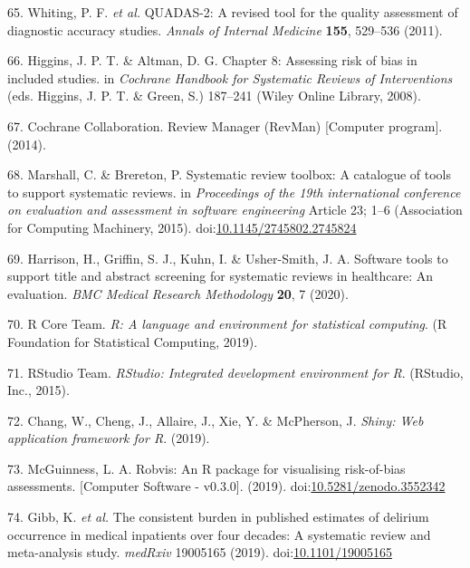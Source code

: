 \documentclass[a4paper, twoside]{templates/ociamthesis}
\begin{document}
\leavevmode\hypertarget{ref-whiting2011quadas}{}%
65. Whiting, P. F. \emph{et al.} QUADAS-2: A revised tool for the quality assessment of diagnostic accuracy studies. \emph{Annals of Internal Medicine} \textbf{155}, 529--536 (2011).

\leavevmode\hypertarget{ref-higgins2008assessing}{}%
66. Higgins, J. P. T. \& Altman, D. G. Chapter 8: Assessing risk of bias in included studies. in \emph{Cochrane Handbook for Systematic Reviews of Interventions} (eds. Higgins, J. P. T. \& Green, S.) 187--241 (Wiley Online Library, 2008).

\leavevmode\hypertarget{ref-cochrane2014review}{}%
67. Cochrane Collaboration. Review Manager (RevMan) {[}Computer program{]}. (2014).

\leavevmode\hypertarget{ref-marshall2015systematic}{}%
68. Marshall, C. \& Brereton, P. Systematic review toolbox: A catalogue of tools to support systematic reviews. in \emph{Proceedings of the 19th international conference on evaluation and assessment in software engineering} Article 23; 1--6 (Association for Computing Machinery, 2015). doi:\href{https://doi.org/10.1145/2745802.2745824}{10.1145/2745802.2745824}

\leavevmode\hypertarget{ref-harrison2020software}{}%
69. Harrison, H., Griffin, S. J., Kuhn, I. \& Usher-Smith, J. A. Software tools to support title and abstract screening for systematic reviews in healthcare: An evaluation. \emph{BMC Medical Research Methodology} \textbf{20}, 7 (2020).

\leavevmode\hypertarget{ref-rref}{}%
70. R Core Team. \emph{R: A language and environment for statistical computing}. (R Foundation for Statistical Computing, 2019).

\leavevmode\hypertarget{ref-rstudioref}{}%
71. RStudio Team. \emph{RStudio: Integrated development environment for R}. (RStudio, Inc., 2015).

\leavevmode\hypertarget{ref-shinyref}{}%
72. Chang, W., Cheng, J., Allaire, J., Xie, Y. \& McPherson, J. \emph{Shiny: Web application framework for R}. (2019).

\leavevmode\hypertarget{ref-mcguinness2019a}{}%
73. McGuinness, L. A. Robvis: An R package for visualising risk-of-bias assessments. {[}Computer Software - v0.3.0{]}. (2019). doi:\href{https://doi.org/10.5281/zenodo.3552342}{10.5281/zenodo.3552342}

\leavevmode\hypertarget{ref-gibb2019consistent}{}%
74. Gibb, K. \emph{et al.} The consistent burden in published estimates of delirium occurrence in medical inpatients over four decades: A systematic review and meta-analysis study. \emph{medRxiv} 19005165 (2019). doi:\href{https://doi.org/10.1101/19005165}{10.1101/19005165}
\end{document}
